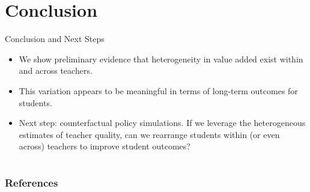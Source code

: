 \documentclass[11pt]{beamer}
\begin{document}

\section{Conclusion}


\begin{frame}{Conclusion and Next Steps}

    \begin{itemize}
        \item We show preliminary evidence that heterogeneity in value added exist within and across teachers.
        \item This variation appears to be meaningful in terms of long-term outcomes for students.
        \item Next step: counterfactual policy simulations. If we leverage the heterogeneous estimates of teacher quality, can we rearrange students within (or even across) teachers to improve student outcomes?
    \end{itemize}

\end{frame}




\section*{}


\begin{frame}[noframenumbering, shrink=15]
    \frametitle{References}
    \centering
    
\end{frame}




\end{document}
